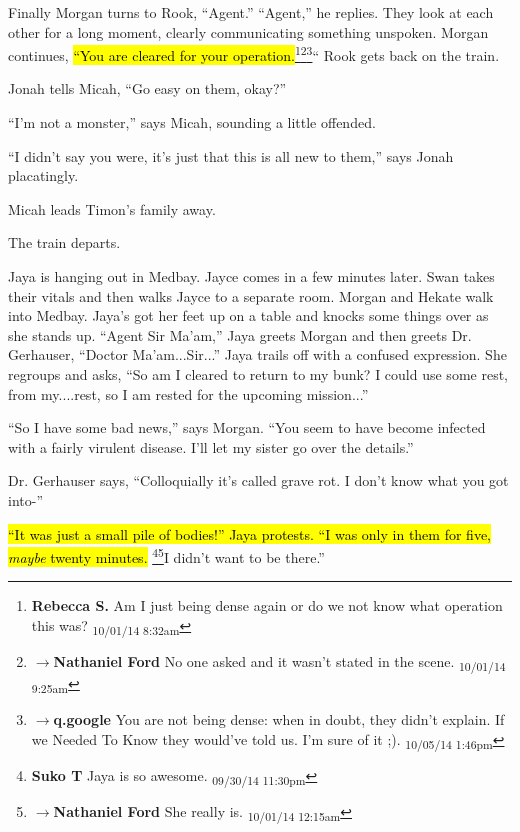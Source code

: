 Finally Morgan turns to Rook, ``Agent.''  ``Agent,'' he replies.  They look at each other for a long moment, clearly communicating something unspoken.  Morgan continues, \hl{``You are cleared for your operation.}\footnote{\textbf{Rebecca S. }Am I just being dense again or do we not know what operation this was? \textsubscript{10/01/14 8:32am}}\footnote{$\rightarrow$\textbf{Nathaniel Ford }No one asked and it wasn't stated in the scene. \textsubscript{10/01/14 9:25am}}\footnote{$\rightarrow$\textbf{q.google }You are not being dense: when in doubt, they didn't explain.  If we Needed To Know they would've told us.  I'm sure of it ;). \textsubscript{10/05/14 1:46pm}}``  Rook gets back on the train.

Jonah tells Micah, ``Go easy on them, okay?''

``I'm not a monster,'' says Micah, sounding a little offended.

``I didn't say you were, it's just that this is all new to them,'' says Jonah placatingly.

Micah leads Timon's family away.

The train departs.





Jaya is hanging out in Medbay.  Jayce comes in a few minutes later.  Swan takes their vitals and then walks Jayce to a separate room.  Morgan and Hekate walk into Medbay.  Jaya's got her feet up on a table and knocks some things over as she stands up. ``Agent Sir Ma'am,'' Jaya greets Morgan and then greets Dr. Gerhauser, ``Doctor Ma'am...Sir...'' Jaya trails off with a confused expression.  She regroups and asks, ``So am I cleared to return to my bunk?  I could use some rest, from my....rest, so I am rested for the upcoming mission...''

``So I have some bad news,'' says Morgan.  ``You seem to have become infected with a fairly virulent disease.  I'll let my sister go over the details.''

Dr. Gerhauser says, ``Colloquially it's called grave rot.  I don't know what you got into-''

\hl{``It was just a small pile of bodies!'' Jaya protests.  ``I was only in them for five, \textit{maybe} twenty minutes.}  \footnote{\textbf{Suko T }Jaya is so awesome. \textsubscript{09/30/14 11:30pm}}\footnote{$\rightarrow$\textbf{Nathaniel Ford }She really is. \textsubscript{10/01/14 12:15am}}I didn't want to be there.''

